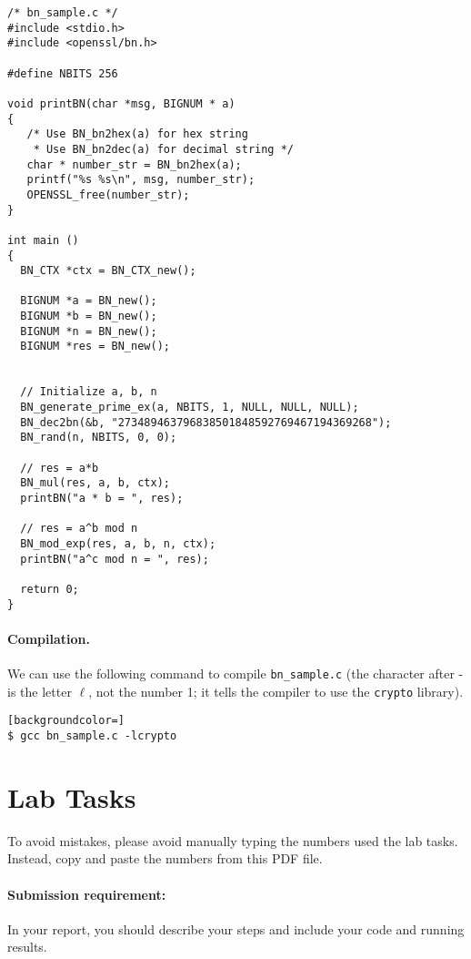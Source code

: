 \begin{lstlisting}
/* bn_sample.c */
#include <stdio.h>
#include <openssl/bn.h>

#define NBITS 256

void printBN(char *msg, BIGNUM * a)
{
   /* Use BN_bn2hex(a) for hex string
    * Use BN_bn2dec(a) for decimal string */
   char * number_str = BN_bn2hex(a);
   printf("%s %s\n", msg, number_str);
   OPENSSL_free(number_str);
}

int main ()
{
  BN_CTX *ctx = BN_CTX_new();

  BIGNUM *a = BN_new();
  BIGNUM *b = BN_new();
  BIGNUM *n = BN_new();
  BIGNUM *res = BN_new();


  // Initialize a, b, n
  BN_generate_prime_ex(a, NBITS, 1, NULL, NULL, NULL);
  BN_dec2bn(&b, "273489463796838501848592769467194369268");
  BN_rand(n, NBITS, 0, 0);

  // res = a*b
  BN_mul(res, a, b, ctx);
  printBN("a * b = ", res);

  // res = a^b mod n
  BN_mod_exp(res, a, b, n, ctx);
  printBN("a^c mod n = ", res);

  return 0;
}
\end{lstlisting}



\paragraph{Compilation.} We can use the following command to
compile \texttt{bn\_sample.c} (the
character after - is the letter $\ell$, not the number 1; it tells the compiler to use the
\texttt{crypto} library).

\begin{lstlisting}[backgroundcolor=]
$ gcc bn_sample.c -lcrypto
\end{lstlisting}



\section{Lab Tasks}


To avoid mistakes, please avoid manually typing the numbers used the lab tasks.
Instead, copy and paste the numbers from this PDF file.


\paragraph{Submission requirement:} In your report, you should describe your steps and include
your code and running results.


